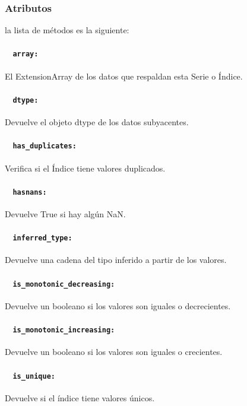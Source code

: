 \subsubsection{Atributos}
la lista de métodos es la siguiente:
\paragraph{~\hspace{2em} \texttt{array:}} El ExtensionArray de los datos que respaldan esta Serie o Índice.
\paragraph{~\hspace{2em} \texttt{dtype:}} Devuelve el objeto dtype de los datos subyacentes.
\paragraph{~\hspace{2em} \texttt{has\_duplicates:}} Verifica si el Índice tiene valores duplicados.
\paragraph{~\hspace{2em} \texttt{hasnans:}} Devuelve True si hay algún NaN.
\paragraph{~\hspace{2em} \texttt{inferred\_type:}} Devuelve una cadena del tipo inferido a partir de los valores.
\paragraph{~\hspace{2em} \texttt{is\_monotonic\_decreasing:}} Devuelve un booleano si los valores son iguales o decrecientes.
\paragraph{~\hspace{2em} \texttt{is\_monotonic\_increasing:}} Devuelve un booleano si los valores son iguales o crecientes.
\paragraph{~\hspace{2em} \texttt{is\_unique:}} Devuelve si el índice tiene valores únicos.
